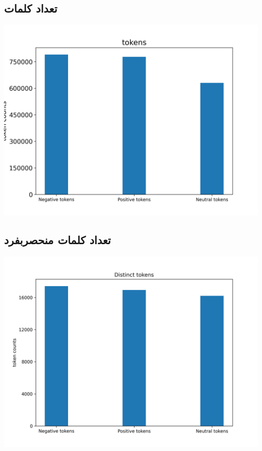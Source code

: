 {	\subsection{تعداد کلمات}
	{
		\selectfont \setLR
		\begin{center}
			\includegraphics[scale=0.75]{../stats/tokens_for_each_label.png}
		\end{center}
		\begin{adjustbox}{width=\textwidth}
		\end{adjustbox}
	}
	\newpage
	\subsection{تعداد کلمات منحصربفرد}
	{
		\selectfont \setLR
		\begin{center}
			\includegraphics[scale=0.75]{../stats/distinct_tokens_for_each_label.png}
		\end{center}
		\begin{adjustbox}{width=\textwidth}
		\end{adjustbox}
	}
	\newpage
}
